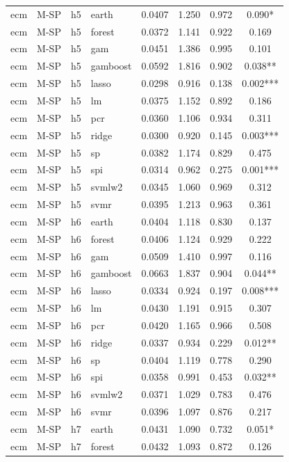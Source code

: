 \begin{ThreePartTable}
\begin{longtable}[t]{llclcccc}
\addlinespace
ecm & M-SP & h5 & earth & 0.0407 & 1.250 & 0.972 & 0.090*\\
ecm & M-SP & h5 & forest & 0.0372 & 1.141 & 0.922 & 0.169\\
ecm & M-SP & h5 & gam & 0.0451 & 1.386 & 0.995 & 0.101\\
ecm & M-SP & h5 & gamboost & 0.0592 & 1.816 & 0.902 & 0.038**\\
ecm & M-SP & h5 & lasso & 0.0298 & 0.916 & 0.138 & 0.002***\\
ecm & M-SP & h5 & lm & 0.0375 & 1.152 & 0.892 & 0.186\\
ecm & M-SP & h5 & pcr & 0.0360 & 1.106 & 0.934 & 0.311\\
ecm & M-SP & h5 & ridge & 0.0300 & 0.920 & 0.145 & 0.003***\\
ecm & M-SP & h5 & sp & 0.0382 & 1.174 & 0.829 & 0.475\\
ecm & M-SP & h5 & spi & 0.0314 & 0.962 & 0.275 & 0.001***\\
ecm & M-SP & h5 & svmlw2 & 0.0345 & 1.060 & 0.969 & 0.312\\
ecm & M-SP & h5 & svmr & 0.0395 & 1.213 & 0.963 & 0.361\\
\addlinespace
ecm & M-SP & h6 & earth & 0.0404 & 1.118 & 0.830 & 0.137\\
ecm & M-SP & h6 & forest & 0.0406 & 1.124 & 0.929 & 0.222\\
ecm & M-SP & h6 & gam & 0.0509 & 1.410 & 0.997 & 0.116\\
ecm & M-SP & h6 & gamboost & 0.0663 & 1.837 & 0.904 & 0.044**\\
ecm & M-SP & h6 & lasso & 0.0334 & 0.924 & 0.197 & 0.008***\\
ecm & M-SP & h6 & lm & 0.0430 & 1.191 & 0.915 & 0.307\\
ecm & M-SP & h6 & pcr & 0.0420 & 1.165 & 0.966 & 0.508\\
ecm & M-SP & h6 & ridge & 0.0337 & 0.934 & 0.229 & 0.012**\\
ecm & M-SP & h6 & sp & 0.0404 & 1.119 & 0.778 & 0.290\\
ecm & M-SP & h6 & spi & 0.0358 & 0.991 & 0.453 & 0.032**\\
ecm & M-SP & h6 & svmlw2 & 0.0371 & 1.029 & 0.783 & 0.476\\
ecm & M-SP & h6 & svmr & 0.0396 & 1.097 & 0.876 & 0.217\\
\addlinespace
ecm & M-SP & h7 & earth & 0.0431 & 1.090 & 0.732 & 0.051*\\
ecm & M-SP & h7 & forest & 0.0432 & 1.093 & 0.872 & 0.126\\

\end{longtable}
\end{ThreePartTable}
